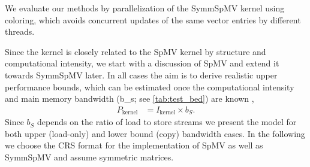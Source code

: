 We evaluate our methods by parallelization of the \acrfull{SymmSpMV}
kernel using \DTWO coloring, which avoids concurrent updates of the
same vector entries by different threads.


Since the kernel is closely related to the \acrfull{SpMV} kernel by
structure and computational intensity, we start with a discussion
of \acrshort{SpMV} and extend it towards \acrshort{SymmSpMV} later. In
all cases the aim is to derive realistic upper performance bounds,
which can be estimated once the computational intensity and main
memory bandwidth (\acrshort{b_s}; see \cref{tab:test_bed}) are
known \cite{Williams_roofline}, \ie
\begin{align}
   	\label{eq:upper_performance}
   	P_\mathrm{kernel}  &= I_\mathrm{kernel}  \times b_S.
  \end{align}
Since $b_S$ depends on the ratio of load to store streams we present
the model for both upper (load-only) and lower bound (copy) bandwidth
cases.
In the following we choose the \acrfull{CRS} format for the
implementation of \acrshort{SpMV} as well as \acrshort{SymmSpMV} and
assume symmetric matrices.

